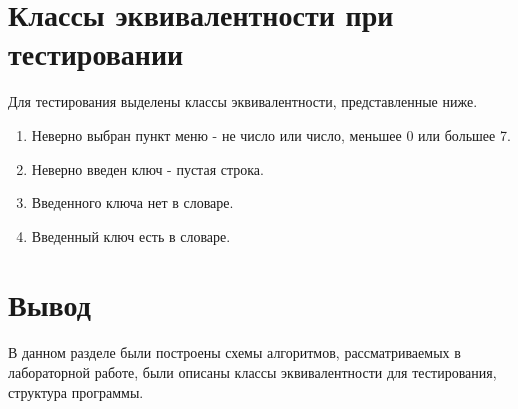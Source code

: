 \clearpage


\section{Классы эквивалентности при тестировании}

Для тестирования выделены классы эквивалентности, представленные ниже.

\begin{enumerate}
	\item Неверно выбран пункт меню - не число или число, меньшее 0 или большее 7.
	\item Неверно введен ключ - пустая строка.
	\item Введенного ключа нет в словаре.
	\item Введенный ключ есть в словаре.
\end{enumerate}


\section{Вывод}

В данном разделе были построены схемы алгоритмов, рассматриваемых в лабораторной работе, были описаны классы эквивалентности для тестирования, структура программы.
